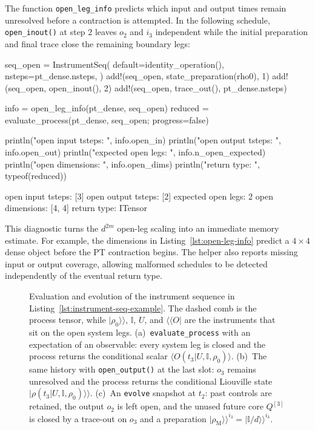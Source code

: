 The function \texttt{open\_leg\_info} predicts which input and output times remain unresolved before a contraction is attempted.
In the following schedule, \texttt{open\_inout()} at step 2 leaves \(o_2\) and \(i_3\) independent while the initial preparation and final trace close the remaining boundary legs:

%
\begin{julialistingpair}[
    caption={Inspecting the open legs before constructing a dense reduced process.}, label={lst:open-leg-info},
    ]
%
    \begin{juliacode}[paired]
seq_open = InstrumentSeq(
    default=identity_operation(),
    nsteps=pt_dense.nsteps,
)
add!(seq_open, state_preparation(rho0), 1)
add!(seq_open, open_inout(), 2)
add!(seq_open, trace_out(), pt_dense.nsteps)

info = open_leg_info(pt_dense, seq_open)
reduced = evaluate_process(pt_dense, seq_open; progress=false)

println("open input tsteps: ", info.open_in)
println("open output tsteps: ", info.open_out)
println("expected open legs: ", info.n_open_expected)
println("open dimensions: ", info.open_dims)
println("return type: ", typeof(reduced))
    \end{juliacode}
%
    \begin{juliaoutput}[paired]
open input tsteps: [3]
open output tsteps: [2]
expected open legs: 2
open dimensions: [4, 4]
return type: ITensor
    \end{juliaoutput}
%
\end{julialistingpair}
%

This diagnostic turns the \(d^{2m}\) open-leg scaling into an immediate memory estimate.
For example, the dimensions in Listing~\ref{lst:open-leg-info} predict a \(4\times4\) dense object before the PT contraction begins.
The helper also reports missing input or output coverage, allowing malformed schedules to be detected independently of the eventual return type.
%
\begin{figure}[ht]
    \centering
    \scalebox{0.85}{}
    \caption{
        Evaluation and evolution of the instrument sequence in Listing~\ref{lst:instrument-seq-example}.
        The dashed comb is the process tensor, while \(\lvert\rho_0\rangle\!\rangle\), \(\mathbb{I}\), \(U\), and \(\langle\!\langle O \rvert\) are the instruments that sit on the open system legs.
        (a)~\texttt{evaluate\_process} with an expectation of an observable: every system leg is closed and the process returns the conditional scalar \(\langle O(t_3\vert U,\mathbb{I},\rho_0)\rangle\).
        (b)~The same history with \texttt{open\_output()} at the last slot: \(o_3\) remains unresolved and the process returns the conditional Liouville state \(\lvert\rho(t_3\vert U,\mathbb{I},\rho_0)\rangle\!\rangle\).
        (c)~An \texttt{evolve} snapshot at \(t_2\): past controls are retained, the output \(o_2\) is left open, and the unused future core \(Q^{[3]}\) is closed by a trace-out on \(o_3\) and a preparation \(\lvert\rho_{\mathrm{M}}\rangle\!\rangle^{i_3}
        =\lvert\mathbb{I}/d\rangle\!\rangle^{i_3}\).
    }
    \label{fig:evaluate-evolve-schedules}
\end{figure}
%

